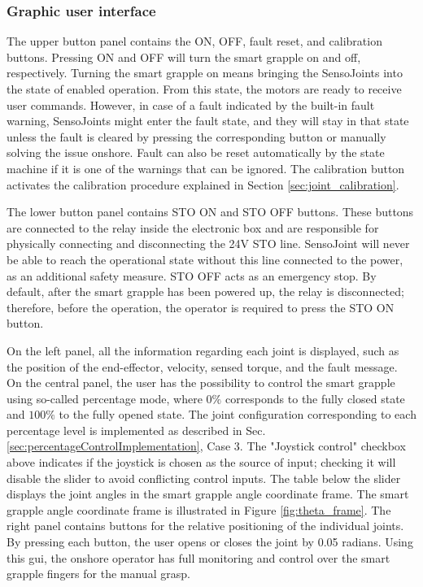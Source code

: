 \subsubsection{Graphic user interface}
The upper button panel contains the ON, OFF, fault reset, and calibration buttons. Pressing ON and OFF will turn the smart grapple on and off, respectively. Turning the smart grapple on means bringing the SensoJoints into the state of enabled operation. From this state, the motors are ready to receive user commands. However, in case of a fault indicated by the built-in fault warning, SensoJoints might enter the fault state, and they will stay in that state unless the fault is cleared by pressing the corresponding button or manually solving the issue onshore. Fault can also be reset automatically by the state machine if it is one of the warnings that can be ignored. The calibration button activates the calibration procedure explained in Section \ref{sec:joint_calibration}.

The lower button panel contains \gls{STO} ON and \gls{STO} OFF buttons. These buttons are connected to the relay inside the electronic box and are responsible for physically connecting and disconnecting the 24V \gls{STO} line. SensoJoint will never be able to reach the operational state without this line connected to the power, as an additional safety measure. \gls{STO} OFF acts as an emergency stop. By default, after the smart grapple has been powered up, the relay is disconnected; therefore, before the operation, the operator is required to press the \gls{STO} ON button.

On the left panel, all the information regarding each joint is displayed, such as the position of the end-effector, velocity, sensed torque, and the fault message. On the central panel, the user has the possibility to control the smart grapple using so-called percentage mode, where \( 0 \%\) corresponds to the fully closed state and \( 100 \%\) to the fully opened state. The joint configuration corresponding to each percentage level is implemented as described in Sec. \ref{sec:percentageControlImplementation}, Case 3. The "Joystick control" checkbox above indicates if the joystick is chosen as the source of input; checking it will disable the slider to avoid conflicting control inputs. The table below the slider displays the joint angles in the smart grapple angle coordinate frame. The smart grapple angle coordinate frame is illustrated in Figure \ref{fig:theta_frame}.  The right panel contains buttons for the relative positioning of the individual joints. By pressing each button, the user opens or closes the joint by 0.05 radians. Using this \gls{gui}, the onshore operator has full monitoring and control over the smart grapple fingers for the manual grasp. 

